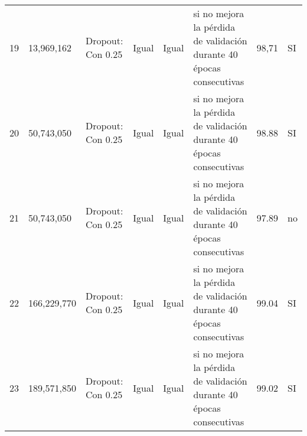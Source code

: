 \begin{tabular}{rlllllll}
           19 & 13,969,162    & Dropout: Con 0.25 & Igual                                   & Igual              & si no mejora la pérdida de validación durante 40 épocas consecutivas & 98,71        & SI               \\
           20 & 50,743,050    & Dropout: Con 0.25 & Igual                                   & Igual              & si no mejora la pérdida de validación durante 40 épocas consecutivas & 98.88        & SI               \\
           21 & 50,743,050    & Dropout: Con 0.25 & Igual                                   & Igual              & si no mejora la pérdida de validación durante 40 épocas consecutivas & 97.89        & no               \\
           22 & 166,229,770   & Dropout: Con 0.25 & Igual                                   & Igual              & si no mejora la pérdida de validación durante 40 épocas consecutivas & 99.04        & SI               \\
           23 & 189,571,850   & Dropout: Con 0.25 & Igual                                   & Igual              & si no mejora la pérdida de validación durante 40 épocas consecutivas & 99.02        & SI               \\
\hline
\end{tabular}